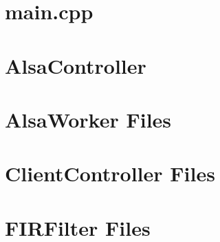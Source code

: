 \documentclass[11pt]{report}
\begin{document}
%





\tableofcontents
\setcounter{page}{3}
\listoffigures
\listoftables
\lstlistoflistings

\pagebreak

\clearpage
{}







\pagebreak




\appendix
\chapter{main.cpp}


\chapter{AlsaController }



\chapter{AlsaWorker Files}



\chapter{ClientController Files}



\chapter{FIRFilter Files}


\end{document}
